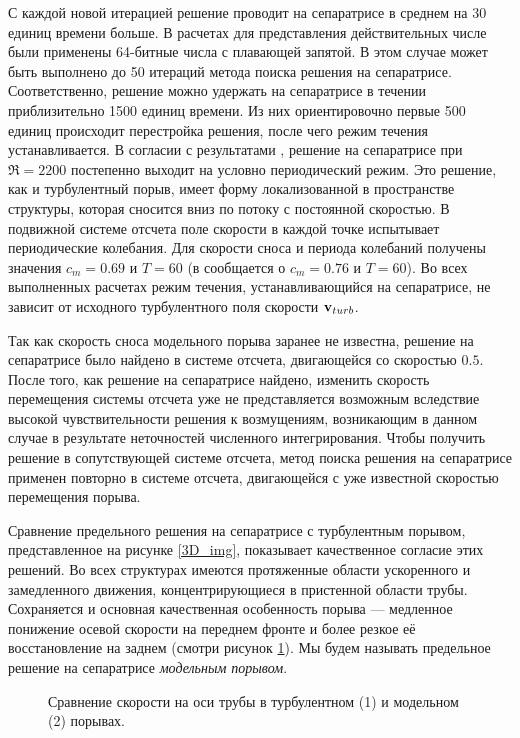 С каждой новой итерацией решение проводит на сепаратрисе в среднем на 30 единиц времени больше. В расчетах для представления действительных числе были применены 64-битные числа с плавающей запятой. В этом случае может быть выполнено до 50 итераций метода поиска решения на сепаратрисе. Соответственно, решение можно удержать на сепаратрисе в течении приблизительно 1500 единиц времени. Из них ориентировочно первые 500 единиц происходит перестройка решения, после чего режим течения устанавливается. В согласии с результатами \cite{Avila2013}, решение на сепаратрисе при $\Re=2200$ постепенно выходит на условно периодический режим. Это решение, как и турбулентный порыв, имеет форму локализованной в пространстве структуры, которая сносится вниз по потоку с постоянной скоростью. В подвижной системе отсчета поле скорости в каждой точке испытывает периодические колебания. Для скорости сноса и периода колебаний получены значения $c_m=0.69$ и $T=60$ (в \cite{Avila2013} сообщается о $c_m=0.76$ и $T=60$). Во всех выполненных расчетах режим течения, устанавливающийся на сепаратрисе, не зависит от исходного турбулентного поля скорости $\mathbf{v}_{turb}$. 

Так как скорость сноса модельного порыва заранее не известна, решение на сепаратрисе было найдено в системе отсчета, двигающейся со скоростью $0.5$. После того, как решение на сепаратрисе найдено, изменить скорость перемещения системы отсчета уже не представляется возможным вследствие высокой чувствительности решения к возмущениям, возникающим в данном случае в результате неточностей численного интегрирования. Чтобы получить решение в сопутствующей системе отсчета, метод поиска решения на сепаратрисе применен повторно в системе отсчета, двигающейся с уже известной скоростью перемещения порыва. 

Сравнение предельного решения на сепаратрисе с турбулентным порывом, представленное на рисунке \ref{3D_img}, показывает качественное согласие этих решений. Во всех структурах имеются протяженные области ускоренного и замедленного движения, концентрирующиеся в пристенной области трубы. Сохраняется и основная качественная особенность порыва --- медленное понижение осевой скорости на переднем фронте и более резкое её восстановление на заднем (смотри рисунок \ref{ucl_cmp_img}). Мы будем называть предельное решение на сепаратрисе {\it модельным порывом}.  

\begin{figure}
\caption{Сравнение скорости на оси трубы в турбулентном (1) и модельном (2) порывах.}
\label{ucl_cmp_img}
\end{figure}

